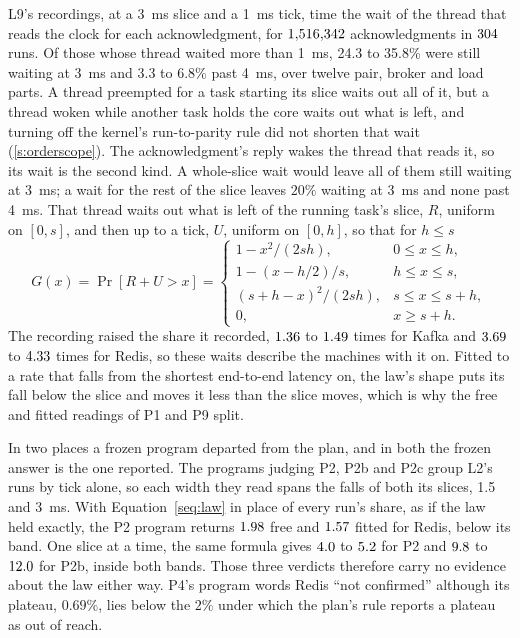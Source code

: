 \documentclass[10pt,journal,onecolumn]{IEEEtran}
\newcommand{\kafka}{Kafka}
\newcommand{\redis}{Redis}
\begin{document}
L9's recordings, at a 3~ms slice and a 1~ms tick, time the wait of the thread that reads the clock
for each acknowledgment, for $1{,}516{,}342$ acknowledgments in $304$ runs. Of those whose thread waited
more than 1~ms, 24.3 to 35.8\% were still waiting at 3~ms and 3.3 to 6.8\% past 4~ms, over twelve
pair, broker and load parts. A thread preempted for a task starting its slice waits out all of it,
but a thread woken while another task holds the core waits out what is left, and turning off the
kernel's run-to-parity rule did not shorten that wait (\ref{s:orderscope}). The acknowledgment's
reply wakes the thread that reads it, so its wait is the second kind. A whole-slice wait would
leave all of them still waiting at 3~ms; a wait for the rest of the slice leaves $20\%$ waiting at
3~ms and none past 4~ms. That thread waits out what is left of the running task's slice, $R$,
uniform on $[0, s]$, and then up to a tick, $U$, uniform on $[0, h]$, so that for $h \le s$
\begin{equation}
\label{seq:restofslice}
G(x) = \Pr[R + U > x] = \begin{cases} 1 - x^2/(2sh), & 0 \le x \le h,\\ 1 - (x - h/2)/s, & h \le x \le s,\\ (s + h - x)^2/(2sh), & s \le x \le s + h,\\ 0, & x \ge s + h. \end{cases}
\end{equation}
The recording raised the share it recorded, $1.36$ to $1.49$ times for \kafka{} and $3.69$ to $4.33$ times
for \redis{}, so these waits describe the machines with it on. Fitted to a rate that falls from the
shortest end-to-end latency on, the law's shape puts its fall below the slice and moves it less
than the slice moves, which is why the free and fitted readings of P1 and P9 split.

In two places a frozen program departed from the plan, and in both the frozen answer is the one
reported. The programs judging P2, P2b and P2c group L2's runs by tick alone, so each width they
read spans the falls of both its slices, 1.5 and 3~ms. With Equation~\ref{seq:law} in place of
every run's share, as if the law held exactly, the P2 program returns $1.98$ free
and $1.57$ fitted for \redis{}, below its band. One slice at a time, the same
formula gives $4.0$ to $5.2$ for P2 and $9.8$ to
$12.0$ for P2b, inside both bands. Those three verdicts therefore carry no evidence
about the law either way. P4's program words \redis{} ``not confirmed'' although its plateau,
$0.69\%$, lies below the $2\%$ under which the plan's rule reports a plateau as out of reach.
\end{document}
